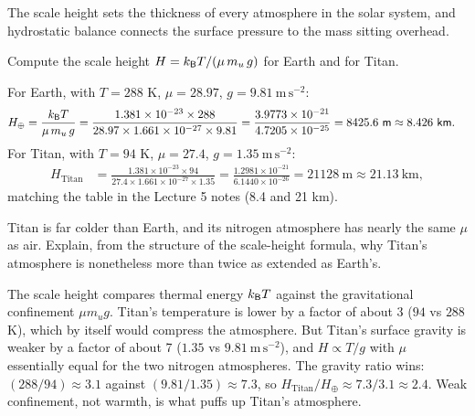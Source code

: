 
The scale height sets the thickness of every atmosphere in the solar system,
and hydrostatic balance connects the surface pressure to the mass sitting overhead.

\parti Compute the scale height $H = k_{\mathsf{B}} T / (\mu\,m_u\,g)$ for Earth and for Titan.

\begin{solution}
For Earth, with $T = 288$ K, $\mu = 28.97$, $g = 9.81\ \mathrm{m\,s^{-2}}$:
\begin{align*}
H_\oplus &= \frac{\kB T}{\mu\,m_u\,g}
= \frac{1.381 \times 10^{-23} \times 288}{28.97 \times 1.661 \times 10^{-27} \times 9.81}
= \frac{3.9773 \times 10^{-21}}{4.7205 \times 10^{-25}} = 8425.6\ \mathrm{m} \approx 8.426\ \mathrm{km}.
\end{align*}
For Titan, with $T = 94$ K, $\mu = 27.4$, $g = 1.35\ \mathrm{m\,s^{-2}}$:
\begin{align*}
H_{\mathrm{Titan}} &= \frac{1.381 \times 10^{-23} \times 94}{27.4 \times 1.661 \times 10^{-27} \times 1.35}
= \frac{1.2981 \times 10^{-21}}{6.1440 \times 10^{-26}} = 21128\ \mathrm{m} \approx 21.13\ \mathrm{km},
\end{align*}
matching the table in the Lecture 5 notes (8.4 and 21 km).
\end{solution}

\parti Titan is far colder than Earth, and its nitrogen atmosphere has nearly the same $\mu$ as air.
Explain, from the structure of the scale-height formula, why Titan's atmosphere is nonetheless more than twice as extended as Earth's.

\begin{solution}
The scale height compares thermal energy $k_{\mathsf{B}} T$ against the gravitational confinement $\mu m_u g$.
Titan's temperature is lower by a factor of about 3 ($94$ vs $288$ K), which by itself would compress the atmosphere.
But Titan's surface gravity is weaker by a factor of about 7 ($1.35$ vs $9.81\ \mathrm{m\,s^{-2}}$), and $H \propto T/g$ with $\mu$ essentially equal for the two nitrogen atmospheres.
The gravity ratio wins: $(288/94) \approx 3.1$ against $(9.81/1.35) \approx 7.3$, so $H_{\mathrm{Titan}}/H_\oplus \approx 7.3/3.1 \approx 2.4$.
Weak confinement, not warmth, is what puffs up Titan's atmosphere.
\end{solution}

